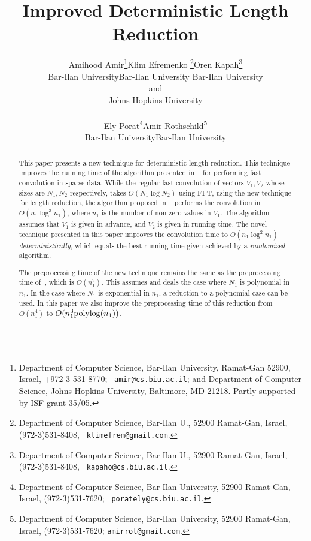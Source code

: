 \documentclass[11pt,amssymb]{article}
\begin{document}
\title{Improved Deterministic Length Reduction}

\author{
\begin{tabular}{ccc}
Amihood Amir\thanks{ Department of Computer Science, Bar-Ilan
University, Ramat-Gan 52900, Israel, +972 3 531-8770; {\tt
amir@cs.biu.ac.il}; and Department of Computer Science, Johns Hopkins
University, Baltimore, MD 21218. Partly supported by ISF grant 35/05.}
&
Klim Efremenko \thanks{Department of Computer Science,
Bar-Ilan U., 52900 Ramat-Gan, Israel, (972-3)531-8408, {\tt
klimefrem@gmail.com}.} &
Oren Kapah\thanks{Department of Computer Science,
Bar-Ilan U., 52900 Ramat-Gan, Israel, (972-3)531-8408, {\tt
kapaho@cs.biu.ac.il}.}
\\
{\small Bar-Ilan University} & {\small Bar-Ilan University} & {\small
  Bar-Ilan University}\\
{\small and} \\
{\small Johns Hopkins University} \\
\\
Ely Porat\thanks{ Department of Computer Science, Bar-Ilan
University, 52900 Ramat-Gan, Israel, (972-3)531-7620; {\tt
porately@cs.biu.ac.il}.} &&
Amir Rothschild\thanks{ Department of
Computer Science, Bar-Ilan University, 52900 Ramat-Gan, Israel,
(972-3)531-7620; {\tt amirrot@gmail.com}.}
\\
{\small Bar-Ilan University} && {\small Bar-Ilan University}
\end{tabular}
}

\date{}

\maketitle
\begin{abstract}
This paper presents a new technique for deterministic length reduction.
This technique improves the running time of the algorithm presented
in ~\cite{LR07} for performing fast convolution in sparse data.
While the regular fast convolution of vectors $V_1,V_2$ whose sizes
are $N_1,N_2$ respectively, takes $O(N_1 \log N_2)$ using FFT, using
the new technique for length reduction, the algorithm proposed in
~\cite{LR07} performs the convolution in $O(n_1 \log^3 n_1)$, where
$n_1$ is the number of non-zero values in $V_1$. The algorithm
assumes that $V_1$ is given in advance, and $V_2$ is given in
running time. The novel technique presented in this paper improves the
convolution time to $O(n_1 \log^2 n_1)$ {\sl deterministically}, which
equals the best running time given achieved by a {\sl randomized}
algorithm.

The preprocessing time of the new technique remains the same as the
preprocessing time of~\cite{LR07}, which is $O(n_1^2)$. This assumes
and deals the case where $N_1$ is polynomial in
$n_1$. In the case where $N_1$ is exponential in $n_1$, a
reduction to a polynomial case can be used. In this paper we also
improve the preprocessing time of this reduction from
$O(n_1^4)$ to $O(n_1^3{\rm polylog}(n_1))$.
\end{abstract}
\end{document}
